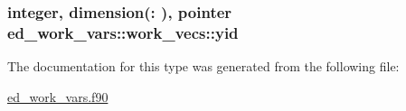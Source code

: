 \subsubsection[{\texorpdfstring{yid}{yid}}]{\setlength{\rightskip}{0pt plus 5cm}integer, dimension(\+:  ), pointer ed\+\_\+work\+\_\+vars\+::work\+\_\+vecs\+::yid}\hypertarget{structed__work__vars_1_1work__vecs_a456fdc2f1a35f3a46bab6d6affac952e}{}\label{structed__work__vars_1_1work__vecs_a456fdc2f1a35f3a46bab6d6affac952e}


The documentation for this type was generated from the following file\+:\begin{DoxyCompactItemize}
\item 
\hyperlink{ed__work__vars_8f90}{ed\+\_\+work\+\_\+vars.\+f90}\end{DoxyCompactItemize}
